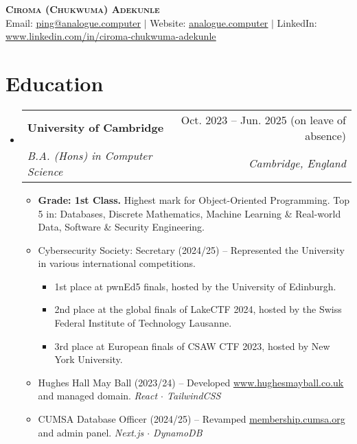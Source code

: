 \documentclass[letterpaper,10pt]{article}
\makeatletter
\newcommand{\link}[2]{\href{#1}{\color{blue}\underline{#2}}}
\newcommand{\resumeItem}[1]{
  \item\small{
    {#1 \vspace{-2pt}}
  }
}
\newcommand{\resumeSubheading}[4]{
  \vspace{-2pt}\item
  \begin{tabular*}{0.97\textwidth}[t]{l@{\extracolsep{\fill}}r}
    \textbf{#1} & #2 \\
    \textit{\small#3} & \textit{\small #4} \\
  \end{tabular*}\vspace{-7pt}
}
\newenvironment{resumeSubHeadingList}{\begin{itemize}[leftmargin=0.15in, label={}]}{\end{itemize}}
\newenvironment{resumeItemList}{\begin{itemize}}{\end{itemize}}
\newenvironment{resumeItemSubList}{\begin{itemize}\setlength\itemsep{0.4em}}{\end{itemize}\vspace{-5pt}}
\makeatother
\begin{document}
\begin{center}
  \textbf{\huge \scshape Ciroma (Chukwuma) Adekunle} \\ \vspace{1pt}
  \small Email: \link{mailto:ping@analogue.computer}{ping@analogue.computer} $|$ Website: \link{https://www.analogue.computer}{analogue.computer} $|$ LinkedIn: \link{https://www.linkedin.com/in/ciroma-chukwuma-adekunle}{www.linkedin.com/in/ciroma-chukwuma-adekunle}
\end{center}

\section{Education}
\begin{resumeSubHeadingList}
  \resumeSubheading
    {University of Cambridge}{Oct. 2023 -- Jun. 2025 (on leave of absence)}
    {B.A. (Hons) in Computer Science}{Cambridge, England}
    \begin{resumeItemList}
      \resumeItem{\textbf{Grade: 1st Class.}
        Highest mark for Object-Oriented Programming.
        Top 5 in: Databases, Discrete Mathematics, Machine Learning \& Real-world Data, Software \& Security Engineering.}

      \resumeItem{Cybersecurity Society: Secretary (2024/25) -- Represented the
                  University in various international competitions.}

        \begin{resumeItemSubList}
          \resumeItem{1st place at pwnEd5 finals, hosted by the University of Edinburgh.}
          \resumeItem{2nd place at the global finals of LakeCTF 2024, hosted by the Swiss Federal Institute of Technology Lausanne.}
          \resumeItem{3rd place at European finals of CSAW CTF 2023, hosted by New York University.}
        \end{resumeItemSubList}

      \resumeItem{Hughes Hall May Ball (2023/24) -- Developed \link{https://www.hughesmayball.co.uk}{www.hughesmayball.co.uk} and managed
       domain. \textit{React $\cdot$ TailwindCSS} }
      \resumeItem{CUMSA Database Officer (2024/25) -- Revamped \link{https://membership.cumsa.org/}{membership.cumsa.org} and admin panel.
       \textit{Next.js $\cdot$ DynamoDB} }
    \end{resumeItemList}
\end{resumeSubHeadingList}
\end{document}
